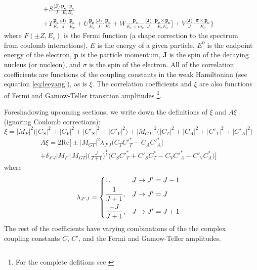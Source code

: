 \begin{multline}
    + S\frac{\langle \boldsymbol{J} \rangle}{J} \frac{\boldsymbol{p_e\cdot p_\nu}}{E_e E_\nu} \\
    + T\frac{\boldsymbol{p_e}}{E_e}\frac{\langle \boldsymbol{J} \rangle}{J} \boldsymbol{\cdot} \frac{\boldsymbol{p_\nu}}{E_\nu}
    + U\frac{\boldsymbol{p_\nu}}{E_\nu}\frac{\langle \boldsymbol{J} \rangle}{J} \boldsymbol{\cdot} \frac{\boldsymbol{p_e}}{E_e}
    + W\frac{\boldsymbol{p_e}}{E_e+m_e}\frac{\langle \boldsymbol{J} \rangle}{J} \boldsymbol{\cdot} \frac{\boldsymbol{p_e \times p_\nu}}{E_e E_\nu}
    \Bigg]
  + V\frac{\langle \boldsymbol{J} \rangle}{J} \boldsymbol{\cdot} \frac{\boldsymbol{\sigma \times p_\nu}}{E_\nu}
  \Bigg\}
  \label{eq:jackson}
\end{multline}
%
where $F(\pm Z, E_e)$ is the Fermi function (a shape correction to the spectrum
from coulomb interactions), $E$ is the energy of a given particle, $E^0$ is the endpoint
energy of the electron, $\boldsymbol{p}$ is the particle momentum, $\boldsymbol{J}$ is the spin of the
decaying nucleus (or nucleon), and $\sigma$ is the spin of the electron. All of the correlation coefficients
are functions of the coupling constants in the weak Hamiltonian (see equation \ref{eq:leeyang}),
as is $\xi$. The correlation coefficients and $\xi$ are also functions of Fermi and Gamow-Teller
transition amplitudes \footnote{For the complete defitions see \cite{jackson1957a,jackson1957b,ebel1957}}.

Foreshadowing upcoming sections, we write down the definitions of $\xi$ and $A\xi$ (ignoring Coulomb
corrections):
%
\begin{equation}
  \xi = |M_F|^2\big(|C_S|^2+|C_V|^2+|C'_S|^2+|C'_V|^2\big)+|M_{GT}|^2\big(|C_T|^2+|C_A|^2+|C'_T|^2+|C'_A|^2\big)
  \label{eq:xi}
\end{equation}
%
\begin{multline}
  A\xi = 2\mathrm{Re}\bigg[\pm |M_{GT}|^2 \lambda_{J'J}\big(C_TC'^*_T-C_AC'^*_A \big) \\
    + \delta_{J'J}|M_F||M_{GT}|\bigg( \frac{J}{J+1} \bigg)^{\frac{1}{2}}\big(C_SC'^*_T+C'_SC^*_T -C_VC'^*_A-C'_VC^*_A \big) \bigg]
  \label{eq:XiA}
\end{multline}
where
\begin{equation}
\lambda_{J'J} =
\begin{dcases}
  1, & J\rightarrow J'=J-1 \\
  \frac{1}{J+1}, &  J\rightarrow J'=J \\
  \frac{-J}{J+1}, &  J\rightarrow J'=J+1 \\
\end{dcases}
\end{equation}
The rest of the coefficients have varying combinations of the the complex coupling
constants $C$, $C'$, and the Fermi and
Gamow-Teller amplitudes.

